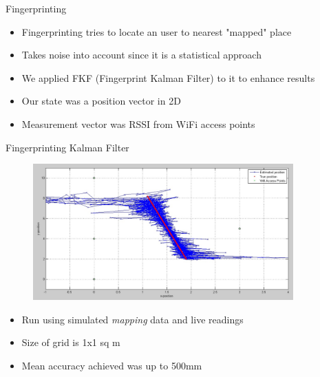 \documentclass{beamer}
\begin{document}
\begin{frame}{Fingerprinting}
\begin{itemize}
  \item Fingerprinting tries to locate an user to nearest "mapped" place
  \item Takes noise into account since it is a statistical approach
  \item We applied FKF (Fingerprint Kalman Filter) to it to enhance results
  \item Our state was a position vector in 2D
  \item Measurement vector was RSSI from WiFi access points
\end{itemize}
\vskip 1cm
\end{frame}
\begin{frame}{Fingerprinting Kalman Filter}
\begin{figure} [ht!]
  \includegraphics[width=100mm]{images/kalmansimulated.jpg}
\end{figure}
\begin{itemize}
  \item Run using simulated \textit{mapping} data and live readings
  \item Size of grid is 1x1 sq m
  \item Mean accuracy achieved was up to 500mm
\end{itemize}
\vskip 1cm
\end{frame}
\end{document}
